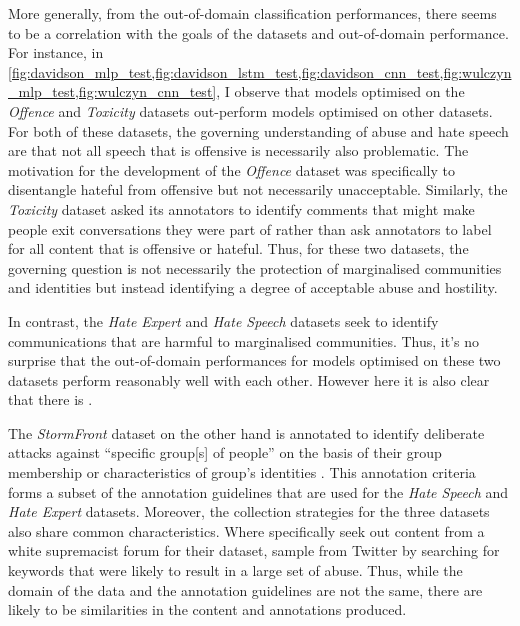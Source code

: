 More generally, from the out-of-domain classification performances, there seems to be a correlation with the goals of the datasets and out-of-domain performance.  
For instance, in \cref{fig:davidson_mlp_test,fig:davidson_lstm_test,fig:davidson_cnn_test,fig:wulczyn_mlp_test,fig:wulczyn_cnn_test}, I observe that models optimised on the \textit{Offence} and \textit{Toxicity} datasets out-perform models optimised on other datasets.  
For both of these datasets, the governing understanding of abuse and hate speech are that not all speech that is offensive is necessarily also problematic.  
The motivation for the development of the \textit{Offence} dataset was specifically to disentangle hateful from offensive but not necessarily unacceptable.  
Similarly, the \textit{Toxicity} dataset asked its annotators to identify comments that might make people exit conversations they were part of rather than ask annotators to label for all content that is offensive or hateful.  
Thus, for these two datasets, the governing question is not necessarily the protection of marginalised communities and identities but instead identifying a degree of acceptable abuse and hostility.  
  
In contrast, the \textit{Hate Expert} and \textit{Hate Speech} datasets seek to identify communications that are harmful to marginalised communities.  
Thus, it's no surprise that the out-of-domain performances for models optimised on these two datasets perform reasonably well with each other.  
However here it is also clear that there is .  
  
The \textit{StormFront} dataset on the other hand is annotated to identify deliberate attacks against ``specific group[s] of people'' on the basis of their group membership or characteristics of group's identities \citep{Garcia:2019}.  
This annotation criteria forms a subset of the annotation guidelines that are used for the \textit{Hate Speech} and \textit{Hate Expert} datasets.  
Moreover, the collection strategies for the three datasets also share common characteristics.  
Where \citet{Garcia:2019} specifically seek out content from a white supremacist forum for their dataset, \citet{Waseem:2016,Waseem-Hovy:2016} sample from Twitter by searching for keywords that were likely to result in a large set of  abuse.  
Thus, while the domain of the data and the annotation guidelines are not the same, there are likely to be similarities in the content and annotations produced.  
  
